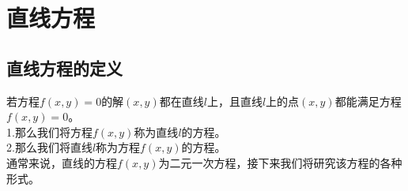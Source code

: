 \documentclass[UTF8]{ctexart}
\begin{document}
\newpage

\section{直线方程}

\subsection{直线方程的定义}
    若方程$f(x,y)=0$的解$(x,y)$都在直线$l$上，且直线$l$上的点$(x,y)$都能满足方程$f(x,y)=0$。\\[3mm]
    1.那么我们将方程$f(x,y)$称为直线$l$的方程。\\[3mm]
    2.那么我们将直线$l$称为方程$f(x,y)$的方程。\\[3mm]
    通常来说，直线的方程$f(x,y)$为二元一次方程，接下来我们将研究该方程的各种形式。
\end{document}
